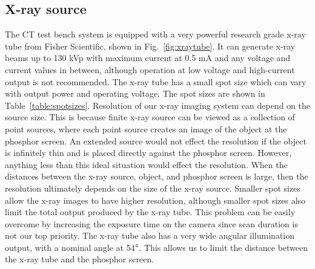 \subsection{X-ray source}
The CT test bench system is equipped with a very powerful research grade x-ray tube from Fisher Scientific, shown in Fig.~\ref{fig:xraytube}.  It can generate x-ray beams up to 130 kVp with maximum current at 0.5 mA and any voltage and current values in between, although operation at low voltage and high-current output is not recommended.  The x-ray tube has a small spot size which can vary with output power and operating voltage.  The spot sizes are shown in Table~\ref{table:spotsizes}.  Resolution of our x-ray imaging system can depend on the source size.  This is because finite x-ray source can be viewed as a collection of point sources, where each point source creates an image of the object at the phosphor screen.  An extended source would not effect the resolution if the object is infinitely thin and is placed directly against the phosphor screen.  However, anything less than this ideal situation would effect the resolution.  When the distances between the x-ray source, object, and phosphor screen is large, then the resolution ultimately depends on the size of the x-ray source.  Smaller spot sizes allow the x-ray images to have higher resolution, although smaller spot sizes also limit the total output produced by the x-ray tube.  This problem can be easily overcome by increasing the exposure time on the camera since scan duration is not our top priority.  The x-ray tube also has a very wide angular illumination output, with a nominal angle at 54$\degree$.  This allows us to limit the distance between the x-ray tube and the phosphor screen.
%
\begin{figure}
\begin{floatrow}
\end{floatrow}
\end{figure}

